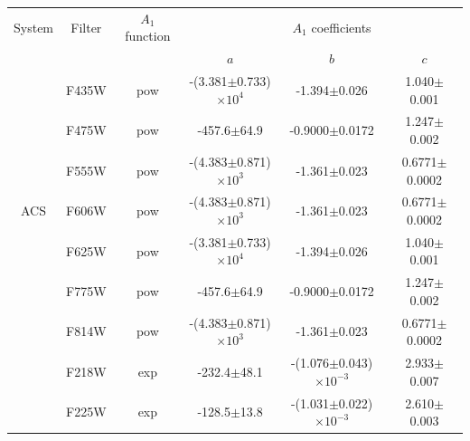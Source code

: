 \documentclass[12pt, a4paper]{report}
\begin{document}
\begin{table}
\begin{center}
\begin{tabular}{cccccc}
\hline
System & Filter & $A_{1}$ function & & $A_{1}$ coefficients & \\
 & & & $a$ & $b$ & $c$ \\
\hline

& F435W & pow & -(3.381$\pm$0.733)$\times 10^{4}$ & -1.394$\pm$0.026 & 1.040$\pm$0.001 \\
& F475W & pow & -457.6$\pm$64.9 & -0.9000$\pm$0.0172 & 1.247$\pm$0.002 \\
& F555W & pow & -(4.383$\pm$0.871)$\times 10^{3}$ & -1.361$\pm$0.023 & 0.6771$\pm$0.0002 \\
ACS & F606W & pow & -(4.383$\pm$0.871)$\times 10^{3}$ & -1.361$\pm$0.023 & 0.6771$\pm$0.0002 \\
& F625W & pow & -(3.381$\pm$0.733)$\times 10^{4}$ & -1.394$\pm$0.026 & 1.040$\pm$0.001 \\
& F775W & pow & -457.6$\pm$64.9 & -0.9000$\pm$0.0172 & 1.247$\pm$0.002 \\
& F814W & pow & -(4.383$\pm$0.871)$\times 10^{3}$ & -1.361$\pm$0.023 & 0.6771$\pm$0.0002 \\ \hline
& F218W & exp & -232.4$\pm$48.1 & -(1.076$\pm$0.043)$\times 10^{-3}$ & 2.933$\pm$0.007 \\
& F225W & exp & -128.5$\pm$13.8 & -(1.031$\pm$0.022)$\times 10^{-3}$ & 2.610$\pm$0.003 \\

\end{tabular}
\end{center}
\end{table}
\end{document}
